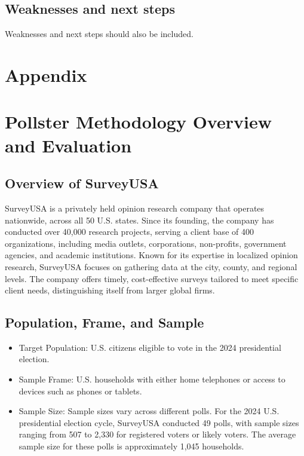 \documentclass[
  letterpaper,
  DIV=11,
  numbers=noendperiod]{scrartcl}
\providecommand{\tightlist}{%
  \setlength{\itemsep}{0pt}\setlength{\parskip}{0pt}}\usepackage{longtable,booktabs,array}
\begin{document}
\subsection{Weaknesses and next steps}\label{weaknesses-and-next-steps}

Weaknesses and next steps should also be included.

\newpage

\appendix

\section*{Appendix}\label{appendix}

\section{Pollster Methodology Overview and
Evaluation}\label{pollster-methodology-overview-and-evaluation}

\subsection{\texorpdfstring{Overview of SurveyUSA\\
}{Overview of SurveyUSA }}\label{overview-of-surveyusa}

SurveyUSA is a privately held opinion research company that operates
nationwide, across all 50 U.S. states. Since its founding, the company
has conducted over 40,000 research projects, serving a client base of
400 organizations, including media outlets, corporations, non-profits,
government agencies, and academic institutions. Known for its expertise
in localized opinion research, SurveyUSA focuses on gathering data at
the city, county, and regional levels. The company offers timely,
cost-effective surveys tailored to meet specific client needs,
distinguishing itself from larger global firms.

\subsection{\texorpdfstring{Population, Frame, and Sample\\
}{Population, Frame, and Sample }}\label{population-frame-and-sample}

\begin{itemize}
\tightlist
\item
  Target Population: U.S. citizens eligible to vote in the 2024
  presidential election.\\
\item
  Sample Frame: U.S. households with either home telephones or access to
  devices such as phones or tablets.\\
\item
  Sample Size: Sample sizes vary across different polls. For the 2024
  U.S. presidential election cycle, SurveyUSA conducted 49 polls, with
  sample sizes ranging from 507 to 2,330 for registered voters or likely
  voters. The average sample size for these polls is approximately 1,045
  households.\\
\end{itemize}
\end{document}
